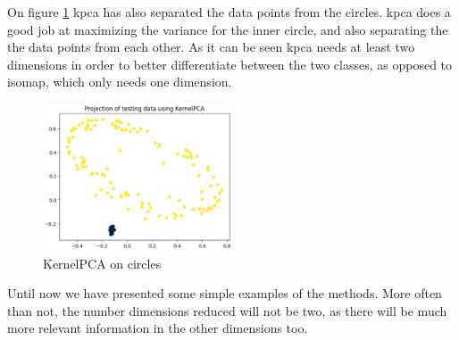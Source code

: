 On figure \ref{fig:circles-kernelpca} \gls{kpca} has also separated the data points from the circles. \gls{kpca} does a good job at maximizing the variance for the inner circle, and also separating the the data points from each other. As it can be seen \gls{kpca} needs at least two dimensions in order to better differentiate between the two classes, as opposed to \gls{isomap}, which only needs one dimension.
\begin{figure}[htb!]
    \centering
    \includegraphics[width=0.5\textwidth]{figures/theory-example-figures/circles-kernelpca.png}
    \caption{KernelPCA on circles}
    \label{fig:circles-kernelpca}
\end{figure}


Until now we have presented some simple examples of the methods. More often than not, the number dimensions reduced will not be two, as there will be much more relevant information in the other dimensions too.

